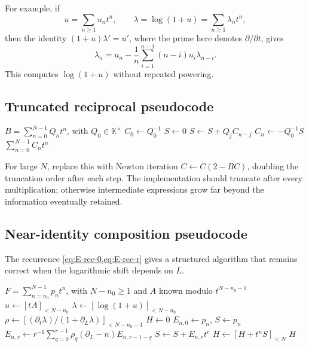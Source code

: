 \documentclass[11pt]{article}
\theoremstyle{pltheorem}
\newcommand{\K}{\mathbb K}
\begin{document}
For example, if
\[
 u=\sum_{n\ge1}u_nt^n,
 \qquad
 \lambda=\log(1+u)=\sum_{n\ge1}\lambda_nt^n,
\]
then the identity \((1+u)\lambda'=u'\), where the prime here denotes \(\partial/\partial t\), gives
\begin{equation}\label{eq:log1p-coeff-recurrence}
 \lambda_n=u_n-\frac{1}{n}\sum_{i=1}^{n-1}(n-i)u_i\lambda_{n-i}.
\end{equation}
This computes \(\log(1+u)\) without repeated powering.

\subsection{Truncated reciprocal pseudocode}

\begin{algorithm}[htbp]
\caption{Reciprocal modulo \(t^N\)}
\label{alg:reciprocal}
\begin{algorithmic}[1]
\Require \(B=\sum_{n=0}^{N-1}Q_nt^n\), with \(Q_0\in\K^\times\)
\State \(C_0\gets Q_0^{-1}\)
  \State \(S\gets0\)
    \State \(S\gets S+Q_jC_{n-j}\)
  \EndFor
  \State \(C_n\gets-Q_0^{-1}S\)
\EndFor
\State \Return \(\sum_{n=0}^{N-1}C_nt^n\)
\end{algorithmic}
\end{algorithm}

For large \(N\), replace this with Newton iteration
\(C\leftarrow C(2-BC)\), doubling the truncation order after each step.  The implementation should truncate after every multiplication; otherwise intermediate expressions grow far beyond the information eventually retained.

\subsection{Near-identity composition pseudocode}

The recurrence \cref{eq:E-rec-0,eq:E-rec-r} gives a structured algorithm
that remains correct when the logarithmic shift depends on \(L\).

\begin{algorithm}[htbp]
\caption{Compose \(F\) with \(G=x+A\) modulo \(t^N\)}
\label{alg:composition}
\begin{algorithmic}[1]
\Require \(F=\sum_{n=n_0}^{N-1}p_nt^n\), with \(N-n_0\ge1\) and \(A\) known modulo \(t^{N-n_0-1}\)
\State \(u\gets[tA]_{<N-n_0}\)
\State \(\lambda\gets[\log(1+u)]_{<N-n_0}\)
\State \(\rho\gets[(\partial_t\lambda)/(1+\partial_L\lambda)]_{<N-n_0-1}\)
\State \(H\gets0\)
  \State \(E_{n,0}\gets p_n\), \(S\gets p_n\)
    \State \(E_{n,r}\gets r^{-1}\sum_{q=0}^{r-1}
      \rho_q(\partial_L-n)E_{n,r-1-q}\)
    \State \(S\gets S+E_{n,r}t^r\)
  \EndFor
  \State \(H\gets[H+t^nS]_{<N}\)
\EndFor
\State \Return \(H\)
\end{algorithmic}
\end{algorithm}
\end{document}
